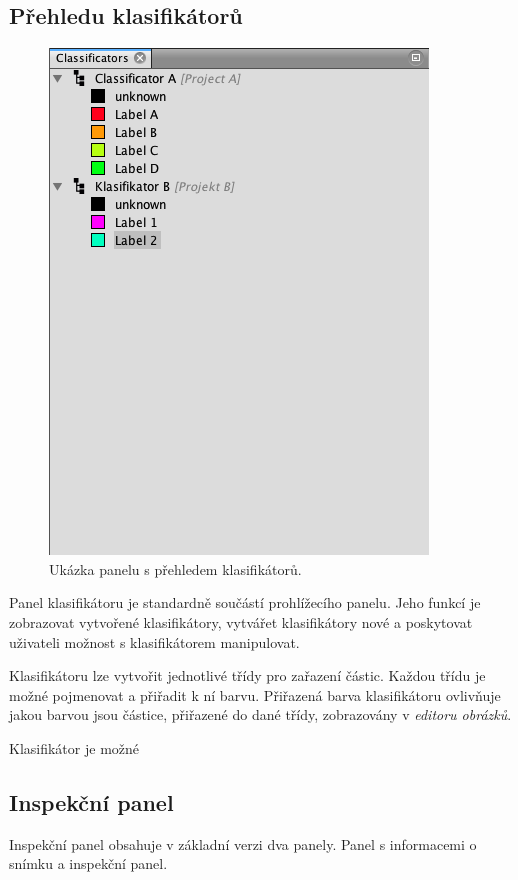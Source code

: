 \documentclass[11pt,twoside,a4paper,table]{book}
\begin{document}
\subsection{Přehledu klasifikátorů}
\begin{figure}[h]
\centering
\includegraphics[scale=0.5]{figures/app_class_overview.png}
\caption{Ukázka panelu s přehledem klasifikátorů.}
\end{figure}

Panel klasifikátoru je standardně součástí prohlížecího panelu. Jeho funkcí je zobrazovat vytvořené klasifikátory, vytvářet klasifikátory nové a poskytovat uživateli možnost s klasifikátorem manipulovat.

Klasifikátoru lze vytvořit jednotlivé třídy pro zařazení částic. Každou třídu je možné pojmenovat a přiřadit k ní barvu. Přiřazená barva klasifikátoru ovlivňuje jakou barvou jsou částice, přiřazené do dané třídy, zobrazovány v \textit{editoru obrázků}.

Klasifikátor je možné 

\subsection{Inspekční panel}
Inspekční panel obsahuje v základní verzi dva panely. Panel s informacemi o snímku a inspekční panel.
\end{document}
